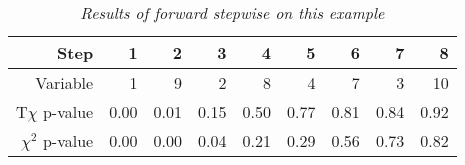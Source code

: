 \begin{table}[ht]
\centering
\begin{tabular}{r|rrrrrrrr}
  \hline
Step & 1 & 2 & 3 & 4 & 5 & 6 & 7 & 8 \\ 
  \hline
Variable & 1 & 9 & 2 & 8 & 4 & 7 & 3 & 10 \\ 
T$\chi$ p-value & 0.00 & 0.01 & 0.15 & 0.50 & 0.77 & 0.81 & 0.84 & 0.92 \\ 
$\chi^2$ p-value & 0.00 & 0.00 & 0.04 & 0.21 & 0.29 & 0.56 & 0.73 & 0.82 \\ 
   \hline
\end{tabular}
\caption{\em Results of forward stepwise on this example}
\label{tab:example}
\end{table}


